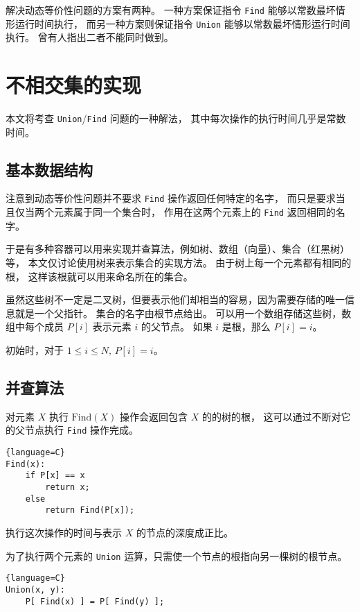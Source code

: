 \documentclass[withoutpreface,bwprint]{cumcmthesis}
\begin{document}
解决动态等价性问题的方案有两种。
一种方案保证指令 \verb|Find| 能够以常数最坏情形运行时间执行，
而另一种方案则保证指令 \verb|Union| 能够以常数最坏情形运行时间执行。
曾有人指出二者不能同时做到。

\section{不相交集的实现}

本文将考查 \verb|Union|/\verb|Find| 问题的一种解法，
其中每次操作的执行时间几乎是常数时间。

\subsection{基本数据结构}

注意到动态等价性问题并不要求 \verb|Find| 操作返回任何特定的名字，
而只是要求当且仅当两个元素属于同一个集合时，
作用在这两个元素上的 \verb|Find| 返回相同的名字。

于是有多种容器可以用来实现并查算法，例如树、数组（向量）、集合（红黑树）等，
本文仅讨论使用树来表示集合的实现方法。
由于树上每一个元素都有相同的根，
这样该根就可以用来命名所在的集合。

虽然这些树不一定是二叉树，但要表示他们却相当的容易，因为需要存储的唯一信息就是一个父指针。
集合的名字由根节点给出。
可以用一个数组存储这些树，数组中每个成员 $P[i]$ 表示元素 $i$ 的父节点。
如果 $i$ 是根，那么 $P[i] = i$。

初始时，对于 $1\le i \le N,\,{}P[i] = i$。

\subsection{并查算法}

对元素 $X$ 执行 $\mathrm{Find}(X)$ 操作会返回包含 $X$ 的的树的根，
这可以通过不断对它的父节点执行 \verb|Find| 操作完成。
\begin{lstlisting}{language=C}
Find(x):
	if P[x] == x
		return x;
	else
		return Find(P[x]);
\end{lstlisting}
执行这次操作的时间与表示 $X$ 的节点的深度成正比。

为了执行两个元素的 \verb|Union| 运算，只需使一个节点的根指向另一棵树的根节点。
\begin{lstlisting}{language=C}
Union(x, y):
	P[ Find(x) ] = P[ Find(y) ];
\end{lstlisting}
\end{document}
